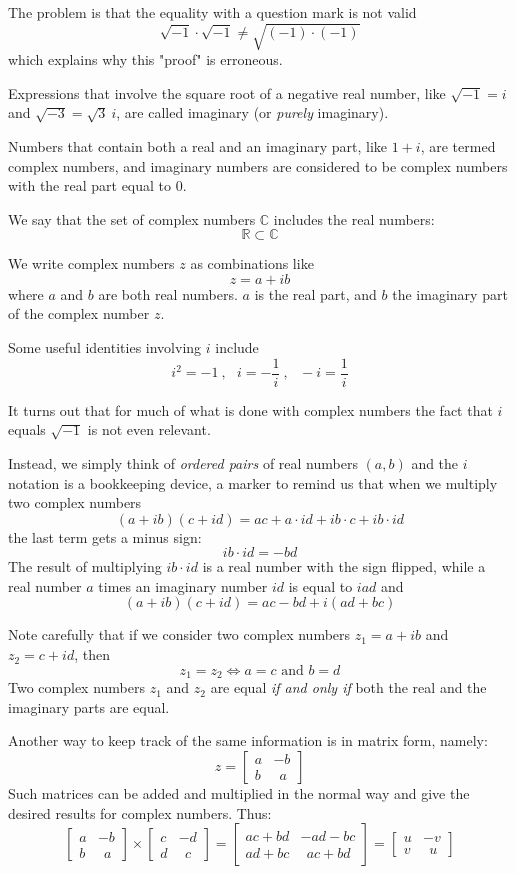 \documentclass[11pt, oneside]{article}   	%
\begin{document}
The problem is that the equality with a question mark is not valid
\[ \sqrt{-1} \cdot \sqrt{-1} \ne \sqrt{(-1)\cdot (-1)} \]
which explains why this "proof" is erroneous.

Expressions that involve the square root of a negative real number, like $\sqrt{-1} = i$ and $\sqrt{-3} = \sqrt{3}\ i$, are called imaginary (or \emph{purely} imaginary).  

Numbers that contain both a real and an imaginary part, like $1 + i$, are termed complex numbers, and imaginary numbers are considered to be complex numbers with the real part equal to $0$.

We say that the set of complex numbers $\mathbb{C}$ includes the real numbers:
\[ \mathbb{R} \subset \mathbb{C} \]

We write complex numbers $z$ as combinations like
\[ z = a + ib \]
 where $a$ and $b$ are both real numbers.  $a$ is the real part, and $b$ the imaginary part of the complex number $z$.

Some useful identities involving $i$ include
\[ i^2 = -1 \ , \ \ \  i = -\frac{1}{i} \ , \ \ \  -i = \frac{1}{i} \]

It turns out that for much of what is done with complex numbers the fact that $i$ equals $\sqrt{-1}$ is not even relevant.

Instead, we simply think of \emph{ordered pairs} of real numbers $(a,b)$ and the $i$ notation is a bookkeeping device, a marker to remind us that when we multiply two complex numbers
\[ (a + ib) (c + id) = ac + a \cdot id + ib \cdot c + ib \cdot id \]
the last term gets a minus sign:
\[ ib \cdot id = -bd \]
The result of multiplying $ib \cdot id$ is a real number with the sign flipped, while a real number $a$ times an imaginary number $id$ is equal to $iad$ and
\[ (a + ib) (c + id) = ac -bd + i(ad + bc) \]

Note carefully that if we consider two complex numbers $z_1 = a + ib$ and $z_2 = c + id$, then 
\[ z_1 = z_2 \iff a = c \text{ and } b = d \]
Two complex numbers $z_1$ and $z_2$ are equal \emph{if and only if} both the real and the imaginary parts are equal.

Another way to keep track of the same information is in matrix form, namely:
\[
z = \begin{bmatrix}
a & -b \\
b &  \ \ a
\end{bmatrix}
\]
Such matrices can be added and multiplied in the normal way and give the desired results for complex numbers.  Thus:
\[
\begin{bmatrix}
a & -b \\
b &  \ \ a
\end{bmatrix} \times
\begin{bmatrix}
c & -d \\
d &  \ \ c
\end{bmatrix} =
\begin{bmatrix}
ac + bd & -ad - bc \\
ad + bc &  \ \ ac + bd
\end{bmatrix} 
=
\begin{bmatrix}
 u & -v \\
v &  \ \ u
\end{bmatrix}
\]
\end{document}
